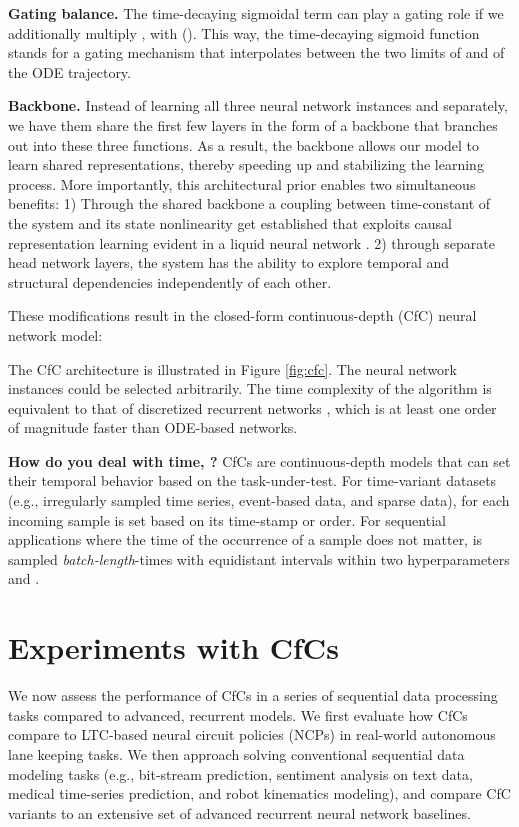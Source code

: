 \documentclass[12pt]{article}
\begin{document}
\noindent \textbf{Gating balance.} The time-decaying sigmoidal term can play a gating role if we additionally multiply , with (). This way, the time-decaying sigmoid function stands for a gating mechanism that interpolates between the two limits of  and  of the ODE trajectory. 

\noindent \textbf{Backbone.} Instead of learning all three neural network instances  and  separately, we have them share the first few layers in the form of a backbone that branches out into these three functions. As a result, the backbone allows our model to learn shared representations, thereby speeding up and stabilizing the learning process. More importantly, this architectural prior enables two simultaneous benefits: 1) Through the shared backbone a coupling between time-constant of the system and its state nonlinearity get established that exploits causal representation learning evident in a liquid neural network  \cite{hasani2021liquid,vorbach2021causal}. 2) through separate head network layers, the system has the ability to explore temporal and structural dependencies independently of each other.  

\noindent These modifications result in the closed-form continuous-depth (CfC) neural network model:



The CfC architecture is illustrated in Figure \ref{fig:cfc}. The neural network instances could be selected arbitrarily. The time complexity of the algorithm is equivalent to that of discretized recurrent networks \cite{hasani2019response}, which is at least one order of magnitude faster than ODE-based networks. 

\noindent \textbf{How do you deal with time, ?} CfCs are continuous-depth models that can set their temporal behavior based on the task-under-test. For time-variant datasets (e.g., irregularly sampled time series, event-based data, and sparse data),  for each incoming sample is set based on its time-stamp or order. For sequential applications where the time of the occurrence of a sample does not matter,  is sampled \textit{batch-length}-times with equidistant intervals within two hyperparameters  and .


\section*{Experiments with CfCs}
We now assess the performance of CfCs in a series of sequential data processing tasks compared to advanced, recurrent models. We first evaluate how CfCs compare to LTC-based neural circuit policies (NCPs) \cite{lechner2020neural} in real-world autonomous lane keeping tasks. We then approach solving conventional sequential data modeling tasks (e.g., bit-stream prediction, sentiment analysis on text data, medical time-series prediction, and robot kinematics modeling), and compare CfC variants to an extensive set of advanced recurrent neural network baselines.
\end{document}
